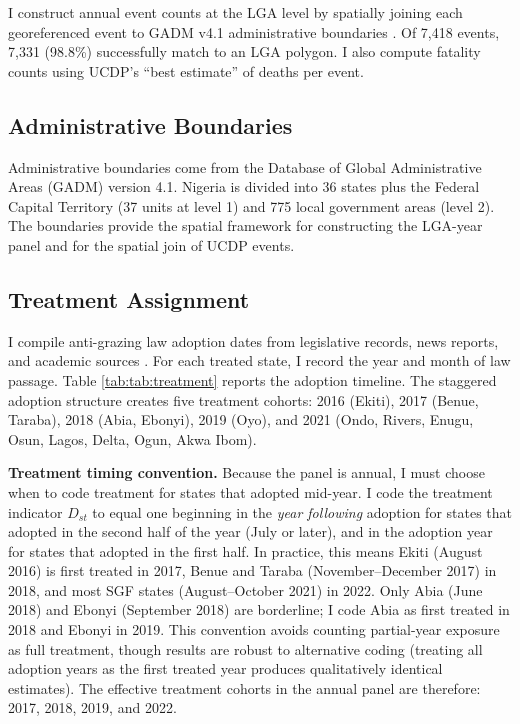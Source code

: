 \documentclass[12pt]{article}
\begin{document}
I construct annual event counts at the LGA level by spatially joining each georeferenced event to GADM v4.1 administrative boundaries \citep{gadm2024}. Of 7,418 events, 7,331 (98.8\%) successfully match to an LGA polygon. I also compute fatality counts using UCDP's ``best estimate'' of deaths per event.

\subsection{Administrative Boundaries}

Administrative boundaries come from the Database of Global Administrative Areas (GADM) version 4.1. Nigeria is divided into 36 states plus the Federal Capital Territory (37 units at level 1) and 775 local government areas (level 2). The boundaries provide the spatial framework for constructing the LGA-year panel and for the spatial join of UCDP events.

\subsection{Treatment Assignment}

I compile anti-grazing law adoption dates from legislative records, news reports, and academic sources \citep{ajala2020anti, ochonu2022anti}. For each treated state, I record the year and month of law passage. Table \ref{tab:tab:treatment} reports the adoption timeline. The staggered adoption structure creates five treatment cohorts: 2016 (Ekiti), 2017 (Benue, Taraba), 2018 (Abia, Ebonyi), 2019 (Oyo), and 2021 (Ondo, Rivers, Enugu, Osun, Lagos, Delta, Ogun, Akwa Ibom).

\textbf{Treatment timing convention.} Because the panel is annual, I must choose when to code treatment for states that adopted mid-year. I code the treatment indicator $D_{st}$ to equal one beginning in the \textit{year following} adoption for states that adopted in the second half of the year (July or later), and in the adoption year for states that adopted in the first half. In practice, this means Ekiti (August 2016) is first treated in 2017, Benue and Taraba (November--December 2017) in 2018, and most SGF states (August--October 2021) in 2022. Only Abia (June 2018) and Ebonyi (September 2018) are borderline; I code Abia as first treated in 2018 and Ebonyi in 2019. This convention avoids counting partial-year exposure as full treatment, though results are robust to alternative coding (treating all adoption years as the first treated year produces qualitatively identical estimates). The effective treatment cohorts in the annual panel are therefore: 2017, 2018, 2019, and 2022.
\end{document}
